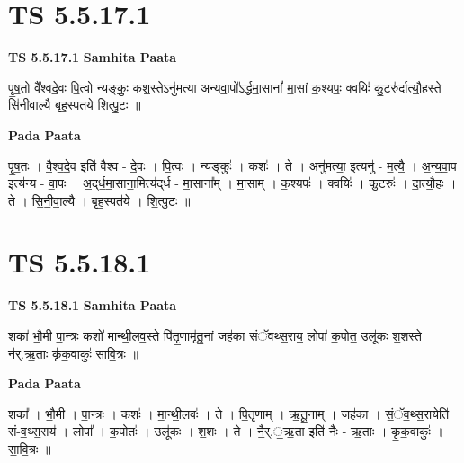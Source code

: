 \documentclass[17pt]{extarticle}
\begin{document}
\section*{ TS 5.5.17.1 }

\textbf{TS 5.5.17.1 } \newline
\textbf{Samhita Paata} \newline

पृ॒ष॒तो वै᳚श्वदे॒वः पि॒त्वो न्यङ्कुः॒ कश॒स्तेऽनु॑मत्या अन्यवा॒पो᳚ऽर्द्धमा॒सानां᳚ मा॒सां क॒श्यपः॒ क्वयिः॑ कु॒टरु॑र्दात्यौ॒हस्ते सि॑नीवा॒ल्यै बृह॒स्पत॑ये शित्पु॒टः ॥ \newline

\textbf{Pada Paata} \newline

पृ॒ष॒तः । वै॒श्व॒दे॒व इति॑ वैश्व - दे॒वः । पि॒त्वः । न्यङ्कुः॑ । कशः॑ । ते । अनु॑मत्या॒ इत्यनु॑ - म॒त्यै॒ । अ॒न्य॒वा॒प इत्य॑न्य - वा॒पः । अ॒द्‌र्ध॒मा॒साना॒मित्य॑द्‌र्ध - मा॒साना᳚म् । मा॒साम् । क॒श्यपः॑ । क्वयिः॑ । कु॒टरुः॑ । दा॒त्यौ॒हः । ते । सि॒नी॒वा॒ल्यै । बृह॒स्पत॑ये । शि॒त्पु॒टः ॥  \newline




\section*{ TS 5.5.18.1 }

\textbf{TS 5.5.18.1 } \newline
\textbf{Samhita Paata} \newline

शका॑ भौ॒मी पा॒न्त्रः कशो॑ मान्थी॒लव॒स्ते पि॑तृ॒णामृ॑तू॒नां जह॑का संॅवथ्स॒राय॒ लोपा॑ क॒पोत॒ उलू॑कः श॒शस्ते न॑र्.ऋ॒ताः कृ॑क॒वाकुः॑ सावि॒त्रः ॥ \newline

\textbf{Pada Paata} \newline

शका᳚ । भौ॒मी । पा॒न्त्रः । कशः॑ । मा॒न्थी॒लवः॑ । ते । पि॒तृ॒णाम् । ऋ॒तू॒नाम् । जह॑का । सं॒ॅव॒थ्स॒रायेति॑ सं-व॒थ्स॒राय॑ । लोपा᳚ । क॒पोतः॑ । उलू॑कः । श॒शः । ते । नै॒र्.॒ऋ॒ता इति॑ नैः - ऋ॒ताः । कृ॒क॒वाकुः॑ । सा॒वि॒त्रः ॥  \newline




\end{document}
